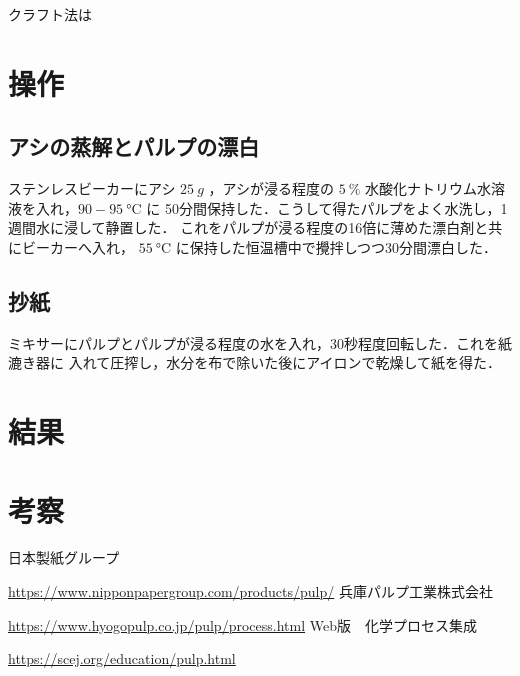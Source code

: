 \documentclass[uplatex, dvipdfmx, 10pt]{jarticle}
\begin{document}
            クラフト法は

        \section*{操作}
            
           \subsection*{アシの蒸解とパルプの漂白}
                
                ステンレスビーカーにアシ $\SI{25}{g}$ ，アシが浸る程度の
                $\SI{5}{\%}$ 水酸化ナトリウム水溶液を入れ，$90-\SI{95}{\celsius}$ に
                50分間保持した．こうして得たパルプをよく水洗し，1週間水に浸して静置した．
                これをパルプが浸る程度の16倍に薄めた漂白剤と共にビーカーへ入れ，
                $\SI{55}{\celsius}$ に保持した恒温槽中で攪拌しつつ30分間漂白した．

            \subsection*{抄紙}

                ミキサーにパルプとパルプが浸る程度の水を入れ，30秒程度回転した．これを紙漉き器に
                入れて圧搾し，水分を布で除いた後にアイロンで乾燥して紙を得た．


        \section*{結果}

        \section*{考察}

            
        \begin{thebibliography}{99}
             日本製紙グループ 

                \url{https://www.nipponpapergroup.com/products/pulp/}
             兵庫パルプ工業株式会社 

                \url{https://www.hyogopulp.co.jp/pulp/process.html}
             Web版　化学プロセス集成 

                \url{https://scej.org/education/pulp.html}
        \end{thebibliography}

    
\end{document}
